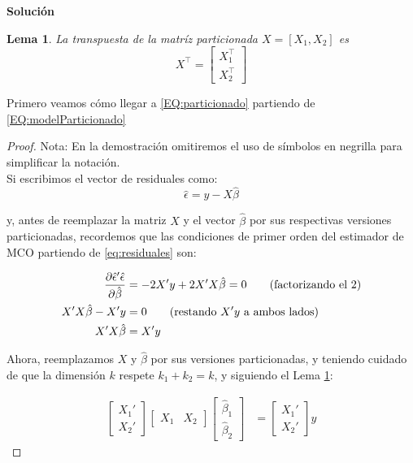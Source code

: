 \documentclass[a4paper, answers, addpoints, 11pt]{exam}
\newtheorem{lemma}{Lema}
\newenvironment{solucion}{%
  \begin{mdframed}[
    backgroundcolor=blue!5,    %
    linecolor=blue!50,          %
    linewidth=2pt,              %
    leftmargin=10pt,            %
    rightmargin=8pt,           %
    topline=true,              %
    bottomline=true,            %
    roundcorner=10pt,           %
    innerleftmargin=10pt,       %
    innerrightmargin=10pt,      %
    innerbottommargin=10pt,     %
    innertopmargin=10pt         %
  ]%
  \begin{tcolorbox}[colframe=blue!50!black, colback=blue!50, coltitle=white, sharp corners=all, boxrule=1mm, width=\textwidth, halign=left, valign=center, top=0mm, bottom=0mm, left=0mm, right=0mm] \textbf{Solución} \end{tcolorbox} }{\end{mdframed}}
\begin{document}
\begin{enumerate}
    \bigskip
  

\begin{solucion}

\begin{lemma}\label{lma1}
La transpuesta de la matríz particionada  \( X = [X_1, X_2] \) es
\[
X^\top = 
\begin{bmatrix}
X_1^\top \\
X_2^\top
\end{bmatrix}
\]
   
\end{lemma}

Primero veamos cómo llegar a  \ref{EQ:particionado} partiendo de \ref{EQ:modelParticionado}

\begin{proof}  

Nota: En la demostración omitiremos el uso de símbolos en negrilla para simplificar la notación.\\

Si escribimos el vector de residuales como:
\begin{equation}
\hat{\epsilon} = y - X\hat{\beta} \label{eq:residuales}
\end{equation}

y, antes de reemplazar la matriz $X$ y el vector $\hat{\beta}$ por sus respectivas versiones particionadas, recordemos que las condiciones de primer orden del estimador de MCO partiendo de \ref{eq:residuales} son:

\begin{align}
\frac{\partial \hat{\epsilon}'\hat{\epsilon}}{\partial \hat{\beta} } &= -2X'y + 2X'X\hat{\beta} = 0 \notag \qquad (\text{factorizando el 2}) \\
X'X\hat{\beta} - X'y &= 0 \notag \qquad (\text{restando $X'y$ a ambos lados})  \\
X'X\hat{\beta} &= X'y \label{eq:condiciones} 
\end{align}

Ahora, reemplazamos $X$ y $\hat{\beta}$ por sus versiones particionadas, y teniendo cuidado de que la dimensión $k$ respete $k_1 + k_2 = k$, y siguiendo el Lema \ref{lma1}:

\begin{align}
\begin{bmatrix}
X_1' \\
X_2'
\end{bmatrix}
\begin{bmatrix}
X_1 & X_2
\end{bmatrix}
\begin{bmatrix}
\hat{\beta}_1 \\
\hat{\beta}_2
\end{bmatrix} &=
\begin{bmatrix}
X_1' \\
X_2'
\end{bmatrix}
y
\end{align}


\end{proof}
\end{solucion}
\end{enumerate}
\end{document}
